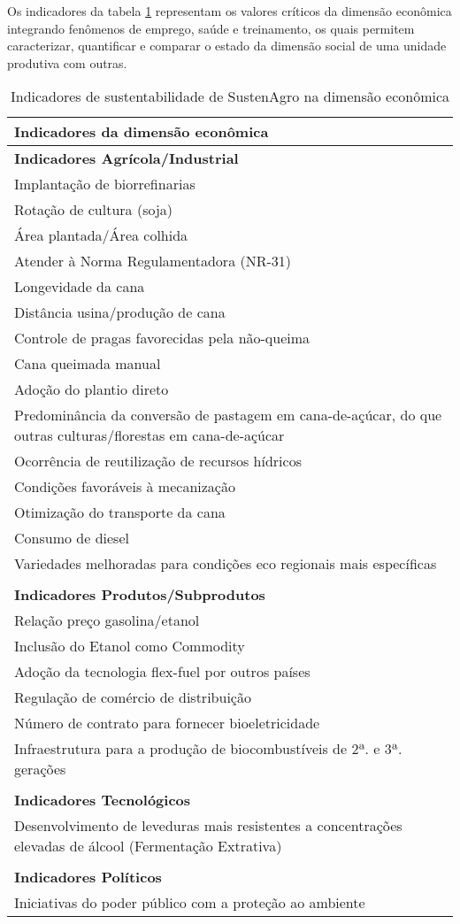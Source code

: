 Os indicadores da tabela \ref{tab:Indicadores-de-sustentabilidade-economica}
representam os valores críticos da dimensão econômica integrando fenômenos
de emprego, saúde e treinamento, os quais permitem caracterizar, quantificar
e comparar o estado da dimensão social de uma unidade produtiva com
outras.

\begin{table}[h]
\begin{tabular}{|>{\raggedright}p{14cm}|}
\hline 
\textbf{Indicadores da dimensão econômica}\tabularnewline
\hline 
\hline 
\textbf{Indicadores Agrícola/Industrial}\tabularnewline
\hline 
Implantação de biorrefinarias\tabularnewline
\hline 
Rotação de cultura (soja)\tabularnewline
\hline 
Área plantada/Área colhida\tabularnewline
\hline 
Atender à Norma Regulamentadora (NR-31)\tabularnewline
\hline 
Longevidade da cana\tabularnewline
\hline 
Distância usina/produção de cana\tabularnewline
\hline 
Controle de pragas favorecidas pela não-queima\tabularnewline
\hline 
Cana queimada manual\tabularnewline
\hline 
Adoção do plantio direto\tabularnewline
\hline 
Predominância da conversão de pastagem em cana-de-açúcar, do que outras
culturas/florestas em cana-de-açúcar\tabularnewline
\hline 
Ocorrência de reutilização de recursos hídricos\tabularnewline
\hline 
Condições favoráveis à mecanização\tabularnewline
\hline 
Otimização do transporte da cana\tabularnewline
\hline 
Consumo de diesel\tabularnewline
\hline 
Variedades melhoradas para condições eco regionais mais específicas\tabularnewline
\hline 
\tabularnewline
\hline 
\textbf{Indicadores Produtos/Subprodutos}\tabularnewline
\hline 
Relação preço gasolina/etanol\tabularnewline
\hline 
Inclusão do Etanol como Commodity\tabularnewline
\hline 
Adoção da tecnologia flex-fuel por outros países\tabularnewline
\hline 
Regulação de comércio de distribuição\tabularnewline
\hline 
Número de contrato para fornecer bioeletricidade\tabularnewline
\hline 
Infraestrutura para a produção de biocombustíveis de 2ª. e 3ª. gerações\tabularnewline
\hline 
\tabularnewline
\hline 
\textbf{Indicadores Tecnológicos}\tabularnewline
\hline 
Desenvolvimento de leveduras mais resistentes a concentrações elevadas
de álcool (Fermentação Extrativa)\tabularnewline
\hline 
\tabularnewline
\hline 
\textbf{Indicadores Políticos}\tabularnewline
\hline 
Iniciativas do poder público com a proteção ao ambiente\tabularnewline
\hline 
\end{tabular}

\caption{Indicadores de sustentabilidade de SustenAgro na dimensão econômica\label{tab:Indicadores-de-sustentabilidade-economica}}
\end{table}

